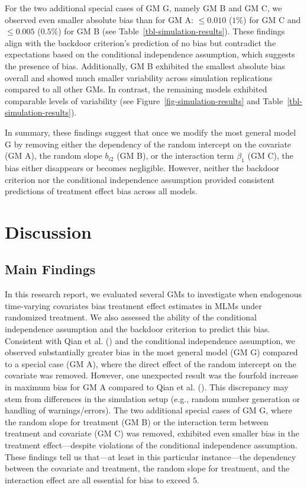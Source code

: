 \documentclass[
  11pt,
  a4paper,
]{article}
\begin{document}
For the two additional special cases of GM G, namely GM B and GM C, we
observed even smaller absolute bias than for GM A: \(\leq 0.010\)
(\(1\%\)) for GM C and \(\leq 0.005\) (\(0.5\%\)) for GM B (see
Table~\ref{tbl-simulation-results}). These findings align with the
backdoor criterion's prediction of no bias but contradict the
expectations based on the conditional independence assumption, which
suggests the presence of bias. Additionally, GM B exhibited the smallest
absolute bias overall and showed much smaller variability across
simulation replications compared to all other GMs. In contrast, the
remaining models exhibited comparable levels of variability (see
Figure~\ref{fig-simulation-results} and
Table~\ref{tbl-simulation-results}).

In summary, these findings suggest that once we modify the most general
model G by removing either the dependency of the random intercept on the
covariate (GM A), the random slope \(b_{i2}\) (GM B), or the interaction
term \(\beta_1\) (GM C), the bias either disappears or becomes
negligible. However, neither the backdoor criterion nor the conditional
independence assumption provided consistent predictions of treatment
effect bias across all models.

\section{Discussion}\label{discussion}

\subsection{Main Findings}\label{main-findings}

In this research report, we evaluated several GMs to investigate when
endogenous time-varying covariates bias treatment effect estimates in
MLMs under randomized treatment. We also assessed the ability of the
conditional independence assumption and the backdoor criterion to
predict this bias. Consistent with Qian et al.
() and the conditional independence
assumption, we observed substantially greater bias in the most general
model (GM G) compared to a special case (GM A), where the direct effect
of the random intercept on the covariate was removed. However, one
unexpected result was the fourfold increase in maximum bias for GM A
compared to Qian et al. (). This
discrepancy may stem from differences in the simulation setup (e.g.,
random number generation or handling of warnings/errors). The two
additional special cases of GM G, where the random slope for treatment
(GM B) or the interaction term between treatment and covariate (GM C)
was removed, exhibited even smaller bias in the treatment
effect---despite violations of the conditional independence assumption.
These findings tell us that---at least in this particular instance---the
dependency between the covariate and treatment, the random slope for
treatment, and the interaction effect are all essential for bias to
exceed \(5%
\).
\end{document}
